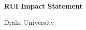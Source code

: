 \documentclass[11pt]{article}
\begin{document}
    \setcounter{page}{1}
    \begin{center}
        {\Large {\bf RUI Impact Statement}}
    \end{center}

    \begin{center}
        {\Large Drake University}
    \end{center}


\end{document}
